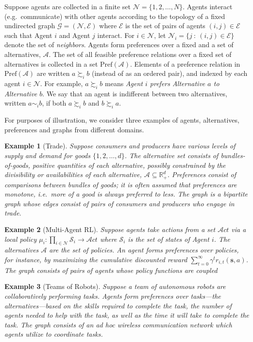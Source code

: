 \documentclass[conference]{ieeeconf}
\newcommand{\R}{\mathbb{R}}
\newcommand{\N}{\mathcal{N}}
\newcommand{\A}{\mathcal{A}}
\renewcommand{\S}{\mathcal{S}}
\newcommand{\E}{\mathcal{E}}
\newcommand{\Pref}{\mathrm{Pref}}
\newcommand{\prefers}{\succsim}
\newcommand{\indif}{\sim}
\newcommand{\graph}{\mathcal{G}}
\newcommand{\Act}{\mathcal{A}ct}
\newtheorem{example}{Example}
\begin{document}
Suppose agents are collected in a finite set $\N = \{1,2,\dots,N\}$. Agents interact (e.g.~communicate) with other agents according to the topology of a fixed undirected graph $\graph = (\N,\E)$ where $\E$ is the set of pairs of agents $(i,j) \in \E$ such that Agent $i$ and Agent $j$ interact. For $i \in \N$, let $\N_i = \{ j~:~(i,j) \in \E\}$ denote the set of \emph{neighbors}. Agents form preferences over a fixed and a set of alternatives, $\A$. The set of all feasible preference relations over a fixed set of alternatives is collected in a set $\Pref(\A)$. Elements of a preference relation in $\Pref(\A)$ are written $a \prefers_i b$ (instead of as an ordered pair), and indexed by each agent $i \in \N$. For example, $a \prefers_i b$ means \emph{Agent $i$ prefers Alternative $a$ to Alternative $b$}. We say that an agent is indifferent between two alternatives, written $a \indif_i b$, if both $a \prefers_i b$ and $b \prefers_i a$.

For purposes of illustration, we consider three examples of agents, alternatives, preferences and graphs from different domains.

\begin{example}[Trade]
    Suppose consumers and producers have various levels of supply and demand for goods $\{1,2,\dots,d\}$. The alternative set consists of  bundles-of-goods, positive quantities of each alternative, possibly constrained by the divisibility or availabilities of each alternative, $\A \subseteq \R^{d}_{+}$. Preferences consist of comparisons between bundles of goods; it is often assumed that preferences are monotone, i.e.~more of a good is always preferred to less. The graph is a bipartite graph whose edges consist of pairs of consumers and producers who engage in trade.
\end{example}
\begin{example}[Multi-Agent RL]
    Suppose agents take actions from a set $\Act$ via a local policy $\mu_i: \prod_{i \in \N} \S_i \to \Act$ where $\S_i$ is the set of states of Agent $i$. The alternatives $\A$ are the set of policies. An agent forms preferences over policies, for instance, by maximizing the cumulative discounted reward $\sum_{t=0}^{\infty} \gamma^t r_{i,t}(\mathbf{s},a)$. The graph consists of pairs of agents whose policy functions are coupled
\end{example}
\begin{example}[Teams of Robots]
    Suppose a team of autonomous robots are collaboratively performing tasks. Agents form preferences over tasks---the alternatives---based on the skills required to complete the task, the number of agents needed to help with the task, as well as the time it will take to complete the task. The graph consists of an \emph{ad hoc} wireless communication network which agents utilize to coordinate tasks.
\end{example}
\end{document}
